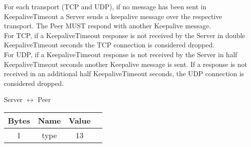 For each transport (TCP and UDP), if no message has been sent in KeepaliveTimeout a Server sends a keepalive
message over the respective transport. The Peer MUST respond with another Keepalive message.\\

For TCP, if a KeepaliveTimeout response is not received by the Server in
double KeepaliveTimeout seconds the TCP connection is considered dropped.\\

For UDP, if a KeepaliveTimeout response is not received by the Server in
half  KeepaliveTimeout seconds another Keepalive message is sent. If a response is not received in
an additional half KeepaliveTimeout seconds, the UDP connection is considered dropped.

\begin{center}
    Server $\leftrightarrow$ Peer\\
    \begin{tabular}{|c|c|c|c|}
        \hline
        \textbf{Bytes} & \textbf{Name} & \textbf{Value} \\
        \hline
        1              & type          & 13              \\
        \hline
    \end{tabular}
\end{center}